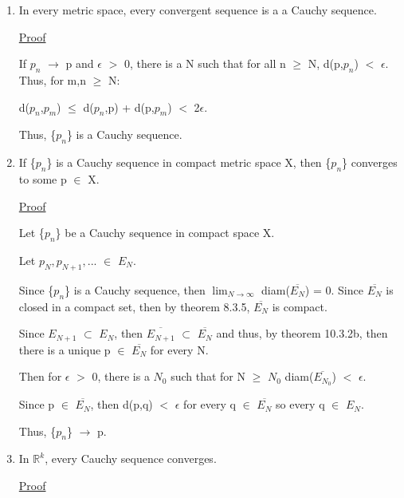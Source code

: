     \begin{enumerate}[label=(\alph*), leftmargin=2cm, itemsep=0.1cm]
        \item In every metric space, every convergent sequence is a
        a Cauchy sequence.

            { \color{magenta} \underline{Proof} }

				If $p_n$ $\rightarrow$ p and $\epsilon$ $>$ 0, there is a N such that
				for all n $\geq$ N, d(p,$p_n$) $<$ $\epsilon$. Thus, for m,n $\geq$ N:

				\hspace{1cm}
				d($p_n$,$p_m$) $\leq$ d($p_n$,p) + d(p,$p_m$) $<$ 2$\epsilon$.

				Thus, \{$p_n$\} is a Cauchy sequence.

        \item If \{$p_n$\} is a Cauchy sequence in compact metric space X,
        then \{$p_n$\} converges to some p $\in$ X.

            { \color{magenta} \underline{Proof} }

				Let \{$p_n$\} be a Cauchy sequence in compact space X.

				Let	$p_N, p_{N+1}, ... $ $\in$ $E_N$.

				Since \{$p_n$\} is a Cauchy sequence, then
				$\lim_{N \rightarrow \infty}$ diam($\overline{E_N}$) = 0.
				Since $\overline{E_N}$ is closed in a compact set, then
				by {\color{red} theorem 8.3.5}, $\overline{E_N}$ is compact.

				Since $E_{N+1}$ $\subset$ $E_N$, then $\overline{E_{N+1}}$
				$\subset$ $\overline{E_N}$ and thus, by {\color{red} theorem 10.3.2b},
				then there is a unique p $\in$ $\overline{E_N}$ for every N.

				Then for $\epsilon$ $>$ 0, there is a $N_0$ such that for N $\geq$ $N_0$
				diam($\overline{E_{N_0}}$) $<$ $\epsilon$.

				Since p $\in$ $\overline{E_N}$, then d(p,q) $<$ $\epsilon$ for every
				q $\in$ $\overline{E_N}$ so every q $\in$ $E_N$.

				Thus, \{$p_n$\} $\rightarrow$ p.

\newpage

        \item In $\mathbb{R}^k$, every Cauchy sequence converges.
        
            { \color{magenta} \underline{Proof} }

            
                
    \end{enumerate}






























